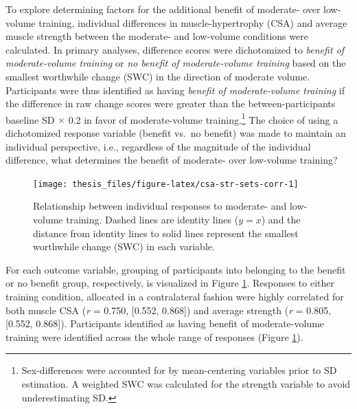 \documentclass[twoside,10pt]{gihclass} %
\begin{document}
To explore determining factors for the additional benefit of moderate- over low-volume training, individual differences in muscle-hypertrophy (CSA) and average muscle strength between the moderate- and low-volume conditions were calculated. In primary analyses, difference scores were dichotomized to \emph{benefit of moderate-volume training} or \emph{no benefit of moderate-volume training} based on the smallest worthwhile change (SWC) in the direction of moderate volume. Participants were thus identified as having \emph{benefit of moderate-volume training} if the difference in raw change scores were greater than the between-participants baseline SD \(\times\) 0.2 in favor of moderate-volume training.\footnote{Sex-differences were accounted for by mean-centering variables prior to SD estimation. A weighted SWC was calculated for the strength variable to avoid underestimating SD.}
The choice of using a dichotomized response variable (benefit vs.~no benefit) was made to maintain an individual perspective, i.e., regardless of the magnitude of the individual difference, what determines the benefit of moderate- over low-volume training?
\begin{figure}

{\centering \texttt{[image: thesis\_files/figure-latex/csa-str-sets-corr-1]} 

}

\caption[Relationship between individual responses to moderate- and low-volume training]{Relationship between individual responses to moderate- and low-volume training. Dashed lines are identity lines ($y = x$) and the distance from identity lines to solid lines represent the smallest worthwhile change (SWC) in each variable.}\label{fig:csa-str-sets-corr}
\end{figure}
For each outcome variable, grouping of participants into belonging to the benefit or no benefit group, respectively, is visualized in Figure \ref{fig:csa-str-sets-corr}. Responses to either training condition, allocated in a contralateral fashion were highly correlated for both muscle CSA (\emph{r} = 0.750, {[}0.552, 0.868{]}) and average strength (\emph{r} = 0.805, {[}0.552, 0.868{]}). Participants identified as having benefit of moderate-volume training were identified across the whole range of responses (Figure \ref{fig:csa-str-sets-corr}).
\end{document}
